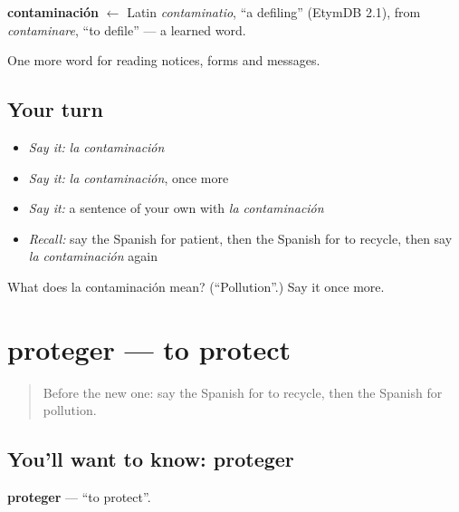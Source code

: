 \begin{cousinweb}
\textbf{contaminación} $\leftarrow$ Latin \emph{contaminatio}, \textquotedblleft{}a defiling\textquotedblright{} (EtymDB 2.1), from \emph{contaminare}, \textquotedblleft{}to defile\textquotedblright{} — a learned word.
\end{cousinweb}

\begin{grammarlens}[title={What you've built}]
One more word for reading notices, forms and messages.
\end{grammarlens}

\subsection*{Your turn}
\begin{itemize}
\raggedright
  \item \emph{Say it:} \emph{la contaminación}
  \item \emph{Say it:} \emph{la contaminación}, once more
  \item \emph{Say it:} a sentence of your own with \emph{la contaminación}
  \item \emph{Recall:} say the Spanish for patient, then the Spanish for to recycle, then say \emph{la contaminación} again
\end{itemize}

\begin{tcolorbox}[breakable,colback=teal!4,colframe=teal!35!black,title={Before you move on}]
What does la contaminación mean? (\textquotedblleft{}Pollution\textquotedblright{}.) Say it once more.
\end{tcolorbox}
\section[proteger]{proteger — to protect}

\label{lesson:ES-C504-proteger}



\begin{quote}
Before the new one: say the Spanish for to recycle, then the Spanish for pollution.
\end{quote}

\subsection*{You'll want to know: proteger}
\textbf{proteger} — \textquotedblleft{}to protect\textquotedblright{}.

